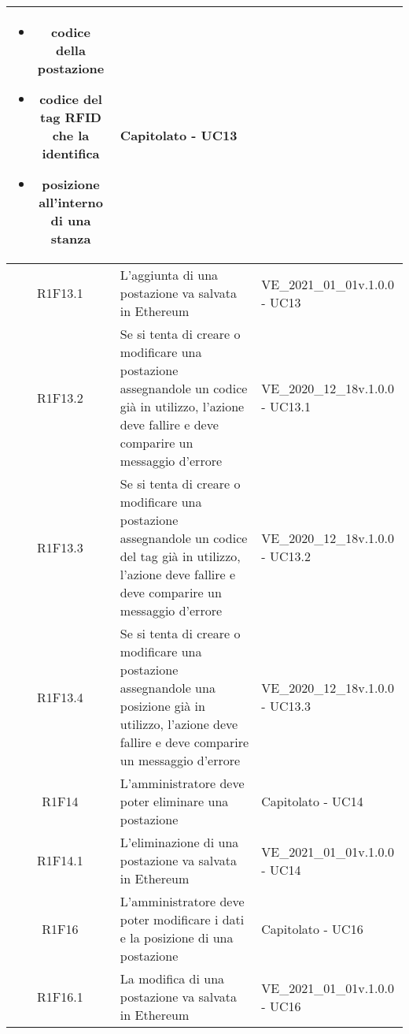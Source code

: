 \begin{center}
\begin{longtable}{|c|p{10cm}|p{4cm}|}
\begin{itemize}
			\item codice della postazione
			\item codice del tag RFID che la identifica
			\item posizione all'interno di una stanza
		\end{itemize} & Capitolato - UC13	\\
		\hline
		R1F13.1&L'aggiunta di una postazione va salvata in Ethereum	&VE\_2021\_01\_01v.1.0.0 - UC13 	\\
		\hline
		R1F13.2&	Se si tenta di creare o modificare una postazione assegnandole un codice già in utilizzo, l'azione deve fallire e deve comparire un messaggio d'errore& VE\_2020\_12\_18v.1.0.0 - UC13.1 	\\
		\hline
		R1F13.3&Se si tenta di creare o modificare una postazione assegnandole un codice del tag già in utilizzo, l'azione deve fallire e deve comparire un messaggio d'errore	&VE\_2020\_12\_18v.1.0.0 - UC13.2 	\\
		\hline
		R1F13.4&Se si tenta di creare o modificare una postazione assegnandole una posizione già in utilizzo, l'azione deve fallire e deve comparire un messaggio d'errore	&VE\_2020\_12\_18v.1.0.0 - UC13.3 	\\
		\hline
		R1F14&L'amministratore deve poter eliminare una postazione	& Capitolato - UC14	\\
		\hline
		R1F14.1	&L'eliminazione di una postazione va salvata in Ethereum	& VE\_2021\_01\_01v.1.0.0 - UC14	\\
		\hline
		R1F16&L'amministratore deve poter modificare i dati e la posizione di una postazione	& Capitolato - UC16	\\
		\hline
		R1F16.1&	La modifica di una postazione va salvata in Ethereum& VE\_2021\_01\_01v.1.0.0 - UC16	\\
		\hline
		

\end{longtable}
\end{center}
